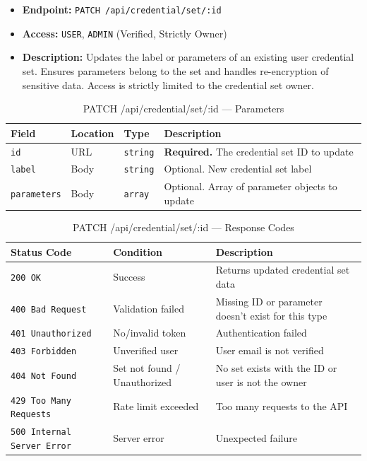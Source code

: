 \begin{itemize}
  \item \textbf{Endpoint:} \texttt{PATCH /api/credential/set/:id}
  \item \textbf{Access:} \texttt{USER}, \texttt{ADMIN} (Verified, Strictly Owner)
  \item \textbf{Description:} Updates the label or parameters of an existing user credential set.
  Ensures parameters belong to the set and handles re-encryption of sensitive data.
  Access is strictly limited to the credential set owner.
\end{itemize}

\begin{table}[H]
\centering
\renewcommand{\arraystretch}{1.3}
\begin{tabularx}{\textwidth}{|l|l|l|X|}
\hline
\textbf{Field} & \textbf{Location} & \textbf{Type} & \textbf{Description} \\
\hline
\texttt{id}          & URL  & \texttt{string}  & \textbf{Required.} The credential set ID to update \\
\hline
\texttt{label}       & Body & \texttt{string}  & Optional. New credential set label \\
\hline
\texttt{parameters}  & Body & \texttt{array}   & Optional. Array of parameter objects to update \\
\hline
\end{tabularx}
\caption{PATCH /api/credential/set/:id — Parameters}
\label{tab:update-user-credential-set-params}
\end{table}

\begin{table}[H]
\centering
\renewcommand{\arraystretch}{1.3}
\begin{tabularx}{\textwidth}{|l|l|X|}
\hline
\textbf{Status Code} & \textbf{Condition} & \textbf{Description} \\
\hline
\texttt{200 OK}           & Success              & Returns updated credential set data \\
\hline
\texttt{400 Bad Request}  & Validation failed    & Missing ID or parameter doesn't exist for this type \\
\hline
\texttt{401 Unauthorized} & No/invalid token     & Authentication failed \\
\hline
\texttt{403 Forbidden}    & Unverified user      & User email is not verified \\
\hline
\texttt{404 Not Found}    & Set not found / Unauthorized  & No set exists with the ID or user is not the owner \\
\hline
\texttt{429 Too Many Requests} & Rate limit exceeded & Too many requests to the API \\
\hline
\texttt{500 Internal Server Error} & Server error & Unexpected failure \\
\hline
\end{tabularx}
\caption{PATCH /api/credential/set/:id — Response Codes}
\label{tab:update-user-credential-set-responses}
\end{table}
\FloatBarrier

